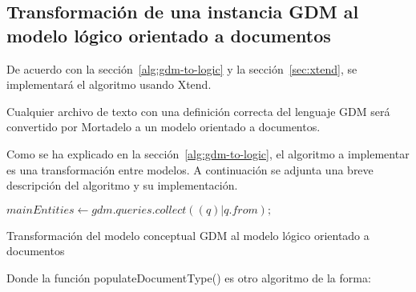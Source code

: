 \subsection{Transformación de una instancia GDM al modelo lógico orientado a documentos}
De acuerdo con la sección~\ref{alg:gdm-to-logic} y la sección~\ref{sec:xtend}, se implementará el algoritmo usando Xtend.

Cualquier archivo de texto con una definición correcta del lenguaje GDM será convertido por Mortadelo a un modelo orientado a documentos.


Como se ha explicado en la sección~\ref{alg:gdm-to-logic}, el algoritmo a implementar es una transformación entre modelos. A continuación se adjunta una breve descripción del algoritmo y su implementación.

\begin{algorithm}[H]

    $mainEntities \gets gdm.queries.collect((q)|q.from);$\\
    
    \caption{Transformación del modelo conceptual GDM al modelo lógico orientado a documentos}
\end{algorithm}

Donde la función populateDocumentType() es otro algoritmo de la forma:

